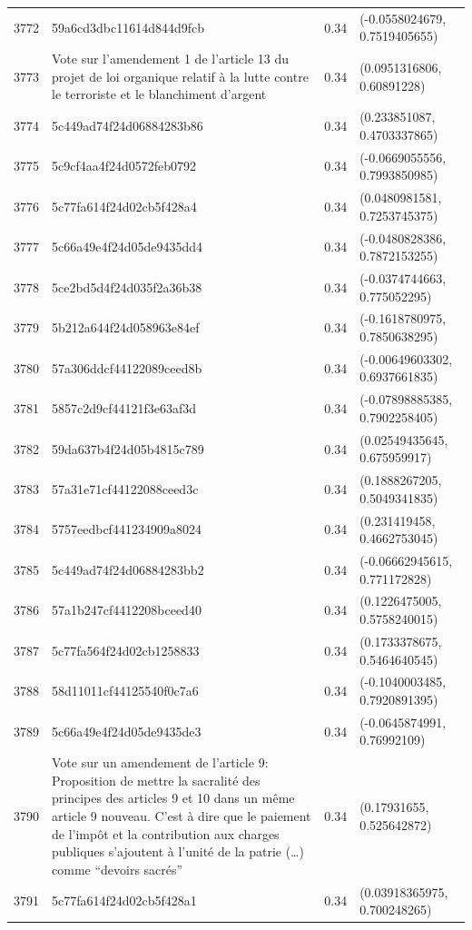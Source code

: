 \begin{table}[ht]
\begin{tabular}{rlrl}
  3772 & 59a6cd3dbc11614d844d9fcb & 0.34 & (-0.0558024679, 0.7519405655) \\ 
  3773 & Vote sur l'amendement 1 de l'article 13 du projet de loi organique relatif à la lutte contre le terroriste et le blanchiment d'argent & 0.34 & (0.0951316806, 0.60891228) \\ 
  3774 & 5c449ad74f24d06884283b86 & 0.34 & (0.233851087, 0.4703337865) \\ 
  3775 & 5c9cf4aa4f24d0572feb0792 & 0.34 & (-0.0669055556, 0.7993850985) \\ 
  3776 & 5c77fa614f24d02cb5f428a4 & 0.34 & (0.0480981581, 0.7253745375) \\ 
  3777 & 5c66a49e4f24d05de9435dd4 & 0.34 & (-0.0480828386, 0.7872153255) \\ 
  3778 & 5ce2bd5d4f24d035f2a36b38 & 0.34 & (-0.0374744663, 0.775052295) \\ 
  3779 & 5b212a644f24d058963e84ef & 0.34 & (-0.1618780975, 0.7850638295) \\ 
  3780 & 57a306ddcf44122089ceed8b & 0.34 & (-0.00649603302, 0.6937661835) \\ 
  3781 & 5857c2d9cf44121f3e63af3d & 0.34 & (-0.07898885385, 0.7902258405) \\ 
  3782 & 59da637b4f24d05b4815c789 & 0.34 & (0.02549435645, 0.675959917) \\ 
  3783 & 57a31e71cf44122088ceed3c & 0.34 & (0.1888267205, 0.5049341835) \\ 
  3784 & 5757eedbcf441234909a8024 & 0.34 & (0.231419458, 0.4662753045) \\ 
  3785 & 5c449ad74f24d06884283bb2 & 0.34 & (-0.06662945615, 0.771172828) \\ 
  3786 & 57a1b247cf4412208bceed40 & 0.34 & (0.1226475005, 0.5758240015) \\ 
  3787 & 5c77fa564f24d02cb1258833 & 0.34 & (0.1733378675, 0.5464640545) \\ 
  3788 & 58d11011cf44125540f0c7a6 & 0.34 & (-0.1040003485, 0.7920891395) \\ 
  3789 & 5c66a49e4f24d05de9435de3 & 0.34 & (-0.0645874991, 0.76992109) \\ 
  3790 & Vote sur un amendement de l'article 9: Proposition de mettre la sacralité des principes des articles 9 et 10 dans un même article 9 nouveau. C’est à dire que le paiement de l’impôt et la contribution aux charges publiques s’ajoutent à l’unité de la patrie (…)  comme “devoirs sacrés” & 0.34 & (0.17931655, 0.525642872) \\ 
  3791 & 5c77fa614f24d02cb5f428a1 & 0.34 & (0.03918365975, 0.700248265) \\ 

\end{tabular}
\end{table}
